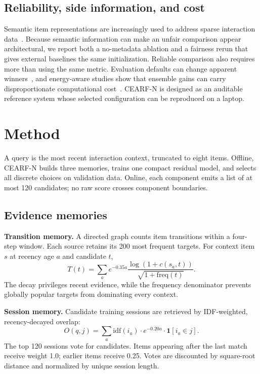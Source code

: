 \documentclass[runningheads]{llncs}
\newcommand{\method}{CEARF-N}
\begin{document}
\subsection{Reliability, side information, and cost}
Semantic item representations are increasingly used to address sparse
interaction data~\cite{llm2rec2025}. Because semantic information can make an
unfair comparison appear architectural, we report both a no-metadata ablation
and a fairness rerun that gives external baselines the same initialization.
Reliable comparison also requires more than using the same metric. Evaluation
defaults can change apparent winners~\cite{defaults2025,seqsplit2026}, and
energy-aware studies show that ensemble gains can carry disproportionate
computational cost~\cite{energy2026,green2025}. \method{} is designed as an
auditable reference system whose selected configuration can be reproduced on a
laptop.

\section{Method}
A query is the most recent interaction context, truncated to eight items.
Offline, \method{} builds three memories, trains one compact residual model,
and selects all discrete choices on validation data. Online, each component
emits a list of at most 120 candidates; no raw score crosses component
boundaries.

\subsection{Evidence memories}
\textbf{Transition memory.} A directed graph counts item transitions within a
four-step window. Each source retains its 200 most frequent targets. For
context item $s$ at recency age $a$ and candidate $t$,
\begin{equation}
T(t)=\sum_a e^{-0.35a}\frac{\log(1+c(s_a,t))}{\sqrt{1+\mathrm{freq}(t)}}.
\end{equation}
The decay privileges recent evidence, while the frequency denominator prevents
globally popular targets from dominating every context.

\textbf{Session memory.} Candidate training sessions are retrieved by
IDF-weighted, recency-decayed overlap:
\begin{equation}
O(q,j)=\sum_a \mathrm{idf}(i_a)\cdot e^{-0.20a}\cdot \mathbf{1}[i_a\in j].
\end{equation}
The top 120 sessions vote for candidates. Items appearing after the last match
receive weight 1.0; earlier items receive 0.25. Votes are discounted by
square-root distance and normalized by unique session length.
\end{document}
